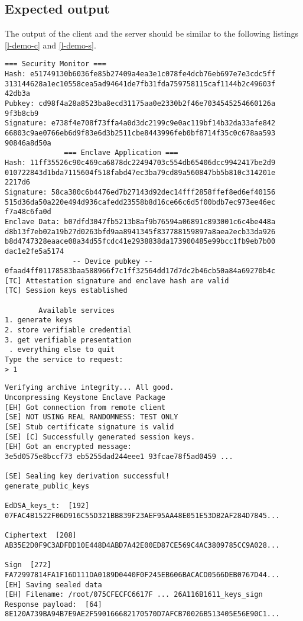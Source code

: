 \subsection{Expected output}
The output of the client and the server should be similar to the following listings \ref{l-demo-c} and \ref{l-demo-s}. \\
\begin{lstlisting}[caption={Example of output at client side},captionpos=b,style=DOS,label={l-demo-c},frame=single]
              === Security Monitor ===
Hash: e51749130b6036fe85b27409a4ea3e1c078fe4dcb76eb697e7e3cdc5ff
313144628a1ec10558cea5ad94641de7fb31fda759758115caf1144b2c49603f
42db3a
Pubkey: cd98f4a28a8523ba8ecd31175aa0e2330b2f46e7034545254660126a
9f3b8cb9
Signature: e738f4e708f73ffa4a0d3dc2199c9e0ac119bf14b32da33afe842
66803c9ae0766eb6d9f83e6d3b2511cbe8443996feb0bf8714f35c0c678aa593
90846a8d50a
              === Enclave Application ===
Hash: 11ff35526c90c469ca6878dc22494703c554db65406dcc9942417be2d9
010722843d1bda7115604f518fabd47ec3ba79cd89a560847bb5b810c314201e
2217d6
Signature: 58ca380c6b4476ed7b27143d92dec14fff2858ffef8ed6ef40156
515d36da50a220e494d936cafedd23558b8d16ce66c6d5f00bdb7ec973ee46ec
f7a48c6fa0d
Enclave Data: b07dfd3047fb5213b8af9b76594a06891c893001c6c4be448a
d8b13f7eb02a19b27d0263bfd9aa8941345f837788159897a8aea2ecb33da926
b8d4747328eaace08a34d55fcdc41e2938838da173900485e99bcc1fb9eb7b00
dac1e2fe5a5174
                -- Device pubkey --
0faad4ff01178583baa588966f7c1ff32564dd17d7dc2b46cb50a84a69270b4c
[TC] Attestation signature and enclave hash are valid
[TC] Session keys established

        Available services
1. generate keys
2. store verifiable credential
3. get verifiable presentation
 . everything else to quit 
Type the service to request:
> 1
\end{lstlisting}
\leavevmode\newline

\begin{lstlisting}[caption={Example of output at server side},captionpos=b,label={l-demo-s},style=DOS,frame=single]
Verifying archive integrity... All good.
Uncompressing Keystone Enclave Package
[EH] Got connection from remote client
[SE] NOT USING REAL RANDOMNESS: TEST ONLY
[SE] Stub certificate signature is valid
[SE] [C] Successfully generated session keys.
[EH] Got an encrypted message:
3e5d0575e8bccf73 eb5255dad244eee1 93fcae78f5ad0459 ...

[SE] Sealing key derivation successful!
generate_public_keys

EdDSA_keys_t:  [192]
07FAC4B1522F06D916C55D321BB839F23AEF95AA48E051E53DB2AF284D7845...

Ciphertext  [208]
AB35E2D0F9C3ADFDD10E448D4ABD7A42E00ED87CE569C4AC3809785CC9A028...

Sign  [272]
FA72997814FA1F16D111DA0189D0440F0F245EB606BACACD0566DEB0767D44...
[EH] Saving sealed data
[EH] Filename: /root/075CFECFC6617F ... 26A116B1611_keys_sign
Response payload:  [64]
8E120A739BA94B7E9AE2F590166682170570D7AFCB70026B513405E56E90C1...
\end{lstlisting}


